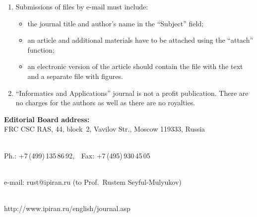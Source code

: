 {\begin{enumerate}[1.]
\item Submissions of files by e-mail must include:\\[-13.5pt]
\begin{itemize}
\item   the journal title and author's name in the ``Subject'' field; \\[-13.5pt]
\item   an article and additional materials have to be attached using the ``attach'' function;\\[-13.5pt]
\item   an electronic version of the article should contain the file with the text and a separate file
with figures.\\[-13.5pt]
\end{itemize}

\item ``Informatics and Applications'' journal is not a profit publication. There are no
charges for the authors as well as there are no royalties.\\[-13.5pt]
\end{enumerate}

\def\leftfootline{\small{\textbf{\thepage}
\hfill INFORMATIKA I EE PRIMENENIYA~--- INFORMATICS AND APPLICATIONS\ \ \ 2017\
\ \ volume~11\ \ \ issue\ 2}
}%
 \def\rightfootline{\small{INFORMATIKA I EE PRIMENENIYA~--- INFORMATICS AND APPLICATIONS\ \ \ 2017\ \ \ volume~11\ \ \ issue\ 2
\hfill \textbf{\thepage}}}

\def\leftkol{Requirements for manuscripts submitted to Journal
``Informatics~and~Applications''}

\def\rightkol{Requirements for manuscripts submitted to Journal
``Informatics~and~Applications''}




\begin{center}
\textbf{Editorial Board address:} \\




FRC CSC RAS, 44, block~2, Vavilov Str., Moscow 119333, Russia\\[-10pt]

\

Ph.: +7\,(499)\,135\,86\,92,\ \ Fax: +7\,(495)\,930\,45\,05\\[-10pt]

\

 e-mail: {\sf rust@ipiran.ru} (to Prof.\ Rustem Seyful-Mulyukov)\\[-10pt]

\

 {\sf http://www.ipiran.ru/english/journal.asp}
\end{center}
 }


